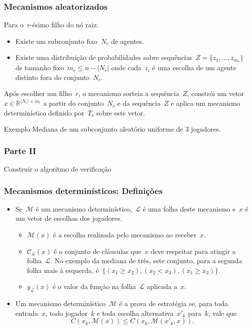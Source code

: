 \documentclass{beamer}
\begin{document}
\begin{frame}
\frametitle{Mecanismos aleatorizados}
Para o~$r$-ésimo filho do nó raiz:
\begin{itemize}
    \item Existe um subconjunto fixo~$N_r$ de agentes.
    \item Existe uma distribuição de probabilidades sobre sequências~$Z = \{ z_{1}, \dots, z_{m_r} \}$ de tamanho fixo~$m_r \leq n - |N_r|$ onde cada~$z_{i}$ é uma escolha de um agente distinto fora do conjunto~$N_r$.
\end{itemize}
Após escolher um filho~$r$, o mecanismo sorteia a sequência~$Z$, constrói um vetor~$x \in \mathbb{R}^{|N_r| + m_r}$ a partir do conjunto~$N_r$ e da sequência~$Z$ e aplica um mecanismo determinístico definido por~$T_r$ sobre este vetor.
\pause
\begin{block}{Exemplo}
Mediana de um subconjunto aleatório uniforme de 3 jogadores.
\end{block}
\end{frame}


\begin{frame}
\frametitle{Parte II}
Construir o algoritmo de verificação
\end{frame}

\begin{frame}
\frametitle{Mecanismos determinísticos: Definições}

\begin{itemize}
\item Se~$\mathcal{M}$ é um mecanismo determinístico,~$\mathcal{L}$ é uma folha deste mecanismo e~$x$ é um vetor de escolhas dos jogadores.
\begin{itemize}
    \item $\mathcal{M}(x)$ é a escolha realizada pelo mecanismo ao receber~$x$.
    \item $\mathcal{C}_\mathcal{L}(x)$ é o conjunto de cláusulas que~$x$ deve respeitar para atingir a folha~$\mathcal{L}$. No exemplo da mediana de três, este conjunto, para a segunda folha mais à esquerda, é~$\{(x_1 \geq x_2),(x_2 < x_3),(x_1 \geq x_3)\}$.
    \item $y_\mathcal{L}(x)$ é o valor da função na folha~$\mathcal{L}$ aplicada a~$x$.
\end{itemize}
\pause
\item Um mecanismo determinístico~$\mathcal{M}$ é a prova de estratégia se, para toda entrada~$x$, todo jogador~$k$ e toda escolha alternativa~$x'_k$ para~$k$, vale que
$$C(x_k,\mathcal{M}(x)) \leq C(x_k,\mathcal{M}(x'_k,x)) \text{.}$$
\end{itemize}
\end{frame}
\end{document}

